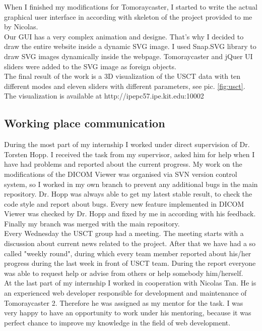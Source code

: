 \documentclass[english]{article}
\begin{document}
When I finished my modifications for Tomoraycaster, I started to write the actual graphical user interface in according with skeleton of the project provided to me by Nicolas.\\

Our GUI has a very complex animation and designe. That's why I decided to draw the entire website inside a dynamic SVG image. I used Snap.SVG library to draw SVG images dynamically inside the webpage. Tomoraycaster and jQuer UI sliders were added to the SVG image as foreign objects.\\

The final result of the work is a 3D visualization of the USCT data with ten different modes and eleven sliders with different parameters, see pic. \ref{fig:usct}. The visualization is available at http://ipepc57.ipe.kit.edu:10002

\subsection{Working place communication}
During the most part of my internship I worked under direct supervision of Dr. Torsten Hopp. I received the task from my supervisor, asked him for help when I have had problems and reported about the current progress. My work on the modifications of the DICOM Viewer was organised via SVN version control system, so I worked in my own branch to prevent any additional bugs in the main repository. Dr. Hopp was always able to get my latest stable result, to check the code style and report about bugs. Every new feature implemented in DICOM Viewer was checked by Dr. Hopp and fixed by me in according with his feedback. Finally my branch was merged with the main repository.\\

Every Wednesday the USCT group had a meeting. The meeting starts with a discussion about current news related to the project. After that we have had a so called "weekly round", during which every team member reported about his/her progress during the last week in front of USCT team. During the report everyone was able to request help or advise from others or help somebody him/herself. \\

At the last part of my internship I worked in cooperation with Nicolas Tan. He is an experienced web developer responsible for development and maintenance of Tomoraycaster 2. Therefore he was assigned as my mentor for the task. I was very happy to have an opportunity to work under his mentoring, because it was perfect chance to improve my knowledge in the field of web development.\\
\end{document}
